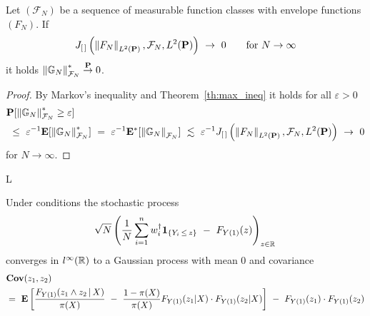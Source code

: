 \begin{lemma}
  \label{markov_max_lemma}
  Let $(\mathcal{F}_N)$ be a sequence of measurable function classes with envelope functions $(F_N)$.
  If
  \begin{gather}
    J_{[\, ]}
    \left( 
    \norm{F_N}_{ L^2(\P)}
    ,
    \mathcal{F}_N
    ,
     L^2(\P)
    \right)
    \ 
    \to
    \ 
    0
    \qquad
    \text{for}
    \ 
    N
    \to
    \infty
  \end{gather}
  it holds 
  $
  \left\lVert\mathbb{G}_N\right\rVert^*_{\mathcal{F}_N}\overset{\mathbf{P}}{\to}0
  $.
\end{lemma}
\begin{proof}
  By Markov's inequality and Theorem~\ref{th:max_ineq} it holds for all $\varepsilon>0$
  \begin{align*}
    &
    \P
    [
  \norm{\G_N}^*_{\mathcal{F}_N}
  \ge
  \varepsilon
    ]
    \\
    &
    \ 
    \le
    \ 
    \varepsilon^{-1}
    \E
    [
  \norm{\G_N}^*_{\mathcal{F}_N}
    ]
    \ 
    =
    \ 
    \varepsilon^{-1}
    \E^*
    [
  \norm{\G_N}_{\mathcal{F}_N}
    ]
    \ 
    \lesssim
    \ 
    \varepsilon^{-1}
    J_{[\, ]}
    \left( 
    \norm{F_N}_{ L^2(\P)}
    ,
    \mathcal{F}_N
    ,
     L^2(\P)
    \right)
    \ 
    \to
    \ 
    0
  \end{align*}
  for $N\to\infty$. 
\end{proof}
L
\begin{ftheorem}
  \label{aa:mean:th}
  Under conditions 
the stochastic process
\begin{gather}
    \sqrt{N}
    \left( 
  \frac{1}{N}
    \sum_{i=1}^{n} 
    w_i^\dagger
    \mathbf{1}
    _{\left\{ Y_i\,\le\, z \right\}}
    \ 
    -
    \ 
    F_{Y(1)}(z)
    \right)
    _{z\in\R}
    \,
  \end{gather}
  converges in
  $l^\infty(\mathbb{R})$
  to a Gaussian process with mean 0 and covariance
\begin{align}
  \label{cov:lp}
  &
  \mathbf{Cov}
  (z_1,z_2)
  \\
  &
  =\ 
  \E
  \left[ 
 \frac{
 F_{Y(1)}(z_1 \land z_2\,|\,X)
}{\pi(X)}
\ 
-
\ 
 \frac{1-\pi(X)}{\pi(X)}
 F_{Y(1)}(z_1|X)
 \cdot
 F_{Y(1)}(z_2|X)
  \right]
  \ 
 -
 \ 
 F_{Y(1)}(z_1)
 \cdot
 F_{Y(1)}(z_2)
\end{align}
\end{ftheorem}

